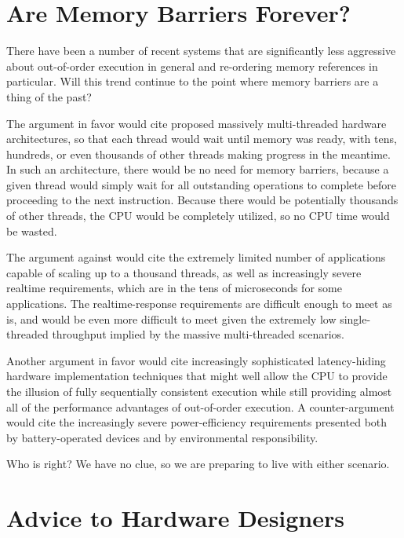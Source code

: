 \fi

\section{Are Memory Barriers Forever?}
\label{sec:app:whymb:Are Memory Barriers Forever?}

There have been a number of recent systems that are significantly less
aggressive about out-of-order execution in general and re-ordering
memory references in particular.
Will this trend continue to the point where memory barriers are a thing
of the past?

The argument in favor would cite proposed massively multi-threaded hardware
architectures, so that each thread would wait until memory was ready,
with tens, hundreds, or even thousands of other threads making progress
in the meantime.
In such an architecture, there would be no need for memory barriers,
because a given thread would simply wait for all outstanding operations
to complete before proceeding to the next instruction.
Because there would be potentially thousands of other threads, the
CPU would be completely utilized, so no CPU time would be wasted.

The argument against would cite the extremely limited number of applications
capable of scaling up to a thousand threads, as well as increasingly
severe realtime requirements, which are in the tens of microseconds
for some applications.
The realtime-response requirements are difficult enough to meet as is,
and would be even more difficult to meet given the extremely low
single-threaded throughput implied by the massive multi-threaded
scenarios.

Another argument in favor would cite increasingly sophisticated
latency-hiding hardware implementation techniques that might well allow
the CPU to provide the illusion of fully sequentially consistent
execution while still providing almost all of the performance advantages
of out-of-order execution.
A counter-argument would cite the increasingly severe power-efficiency
requirements presented both by battery-operated devices and by
environmental responsibility.

Who is right?
We have no clue, so we are preparing to live with either scenario.

\section{Advice to Hardware Designers}
\label{sec:app:whymb:Advice to Hardware Designers}

